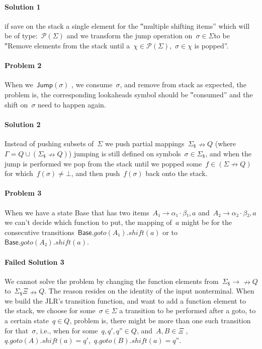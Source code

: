 \paragraph{Solution 1} if save on the stack a single element for the
  ‟multiple shifting items” which will be of type:~$\mathcal{P}(Σ)$
  and we transform the jump operation on~$σ∈Σ$to be ‟Remove elements
  from the stack until a~$χ∈\mathcal{P}(Σ)$,~$σ∈χ$ is popped”.

\paragraph{Problem 2} When we~$\textsf{Jump}(σ)$ , we consume~$σ$, and remove
  from stack as expected, the problem is, the corresponding lookaheads symbol
  should be ‟consumed” and the shift on~$σ$ need to happen again.

\paragraph{Solution 2} Instead of pushing subsets of~$Σ$ we push partial
  mappings~$Σ_{\$}↛Q$ (where~$Γ=Q∪(Σ_{\$}↛Q)$) jumping is still defined
  on symbols~$σ∈Σ_{\$}$, and when the jump is performed we pop from the stack
  until we popped some~$f∈(Σ↛Q)$ for which~$f(σ)≠⊥$, and then push~$f(σ)$ back onto the stack.

\paragraph{Problem 3} When we have a state \textsf{Base} that has
  two items~$A₁→α₁·β₁,a$ and~$A₂→α₂·β₂,a$ we can't decide which function to put,
  the mapping of~$a$ might be for the consecutive
  transitions~$\textsf{Base}.goto(A₁).shift(a)$ or to~$\textsf{Base}.goto(A₂).shift(a)$.

\paragraph{Failed Solution 3} We cannot solve the problem by changing the function elements from~$Σ_\$→↛Q$
  to~$Σ_\$Ξ↛Q$. The reason resides on the identity of the input nonterminal.
  When we build the JLR's transition function, and want to add a function element to the stack, we choose for some~$σ∈Σ$
  a transition to be performed after a goto, to a certain state~$q∈Q$, problem is, there might be more than one such transition
  for that~$σ$, i.e., when for some~$q,q',q”∈Q$, and~$A,B∈Ξ$ ,~$q.goto(A).shift(a)=q'$,~$q.goto(B).shift(a)=q”$.

